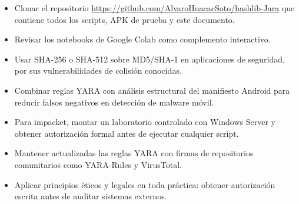 \documentclass[12pt,a4paper]{article}
\begin{document}
\begin{itemize}
\item Clonar el repositorio \url{https://github.com/AlvaroHuacacSoto/hashlib-Jara}
  que contiene todos los scripts, APK de prueba y este documento.

\item Revisar los notebooks de Google Colab como complemento interactivo.

\item Usar SHA-256 o SHA-512 sobre MD5/SHA-1 en aplicaciones de seguridad,
  por sus vulnerabilidades de colisión conocidas.

\item Combinar reglas YARA con análisis estructural del manifiesto Android
  para reducir falsos negativos en detección de malware móvil.

\item Para impacket, montar un laboratorio controlado con Windows Server y
  obtener autorización formal antes de ejecutar cualquier script.

\item Mantener actualizadas las reglas YARA con firmas de repositorios
  comunitarios como YARA-Rules y VirusTotal.

\item Aplicar principios éticos y legales en toda práctica: obtener
  autorización escrita antes de auditar sistemas externos.
\end{itemize}
\end{document}

